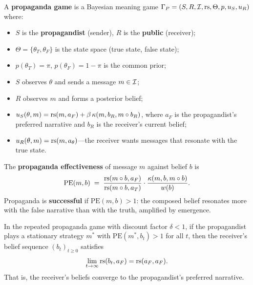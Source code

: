 \begin{game}
\label{game:propaganda}
A \textbf{propaganda game} is a Bayesian meaning game
$\Gamma_P = (S, R, \mathcal{I}, \mathrm{rs}, \Theta, p, u_S, u_R)$ where:
\begin{itemize}
  \item $S$ is the \textbf{propagandist} (sender),
    $R$ is the \textbf{public} (receiver);
  \item $\Theta = \{\theta_T, \theta_F\}$ is the state space
    (true state, false state);
  \item $p(\theta_T) = \pi$, $p(\theta_F) = 1-\pi$ is the common prior;
  \item $S$ observes $\theta$ and sends a message $m \in \mathcal{I}$;
  \item $R$ observes $m$ and forms a posterior belief;
  \item $u_S(\theta, m) = \mathrm{rs}(m, a_F) + \beta\,\kappa(m, b_R, m \circ b_R)$,
    where $a_F$ is the propagandist's preferred narrative and $b_R$
    is the receiver's current belief;
  \item $u_R(\theta, m) = \mathrm{rs}(m, a_\theta)$---the receiver wants
    messages that resonate with the true state.
\end{itemize}
\end{game}

\begin{definition}
\label{def:propaganda-effectiveness}
The \textbf{propaganda effectiveness} of message $m$ against
belief $b$ is
\[
  \mathrm{PE}(m, b) \;=\;
  \frac{\mathrm{rs}(m \circ b, a_F)}{\mathrm{rs}(m \circ b, a_T)}
  \cdot
  \frac{\kappa(m, b, m \circ b)}{w(b)}.
\]
Propaganda is \textbf{successful} if $\mathrm{PE}(m,b) > 1$:
the composed belief resonates more with the false narrative
than with the truth, amplified by emergence.
\end{definition}

\begin{theorem}
\label{thm:propaganda-convergence}
In the repeated propaganda game with discount factor $\delta < 1$,
if the propagandist plays a stationary strategy $m^*$ with
$\mathrm{PE}(m^*, b_t) > 1$ for all $t$, then the receiver's
belief sequence $(b_t)_{t \ge 0}$ satisfies
\[
  \lim_{t \to \infty} \mathrm{rs}(b_t, a_F) = \mathrm{rs}(a_F, a_F).
\]
That is, the receiver's beliefs converge to the propagandist's
preferred narrative.
\end{theorem}


